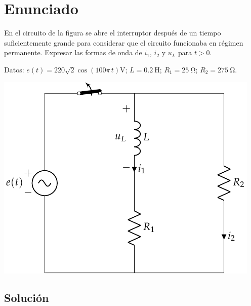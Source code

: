 \section{Enunciado}
En el circuito de la figura se abre el interruptor después de un tiempo suficientemente grande para considerar que el circuito funcionaba en régimen permanente. Expresar las formas de onda de $i_1$, $i_2$ y $u_L$ para $t>0$.

Datos: $e(t)=220\sqrt{2}\cos(100\pi\,t)\unit{\volt}$; $L = \qty{0.2}{\henry}$; $R_1 = \qty{25}{\ohm}$; $R_2 = \qty{275}{\ohm}$. 

\begin{center}
  \includegraphics{figuras/BT4_05.pdf}
\end{center}

\subsection*{Solución}


